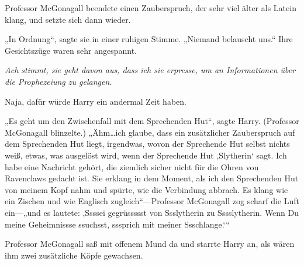 Professor McGonagall beendete einen Zauberspruch, der sehr viel älter als Latein klang, und setzte sich dann wieder.

„In Ordnung“, sagte sie in einer ruhigen Stimme. „Niemand belauscht uns.“ Ihre Gesichtszüge waren sehr angespannt.

\emph{Ach stimmt, sie geht davon aus, dass ich sie erpresse, um an Informationen über die Prophezeiung zu gelangen.}

Naja, dafür würde Harry ein andermal Zeit haben.

„Es geht um den Zwischenfall mit dem Sprechenden Hut“, sagte Harry. (Professor McGonagall blinzelte.) „Ähm…ich glaube, dass ein zusätzlicher Zauberspruch auf dem Sprechenden Hut liegt, irgendwas, wovon der Sprechende Hut selbst nichts weiß, etwas, was ausgelöst wird, wenn der Sprechende Hut ‚Slytherin‘ sagt. Ich habe eine Nachricht gehört, die ziemlich sicher nicht für die Ohren von Ravenclaws gedacht ist. Sie erklang in dem Moment, als ich den Sprechenden Hut von meinem Kopf nahm und spürte, wie die Verbindung abbrach. Es klang wie ein Zischen und wie Englisch zugleich“—Professor McGonagall zog scharf die Luft ein—„und es lautete: ‚Ssssei gegrüssssst von Ssslytherin zu Sssslytherin. Wenn Du meine Geheimnissse ssuchsst, sssprich mit meiner Ssschlange.‘“

Professor McGonagall saß mit offenem Mund da und starrte Harry an, als wären ihm zwei zusätzliche Köpfe gewachsen.


